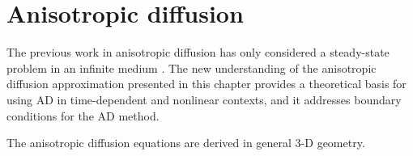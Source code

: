 
\chapter{Anisotropic diffusion}\label{chap:adDerivation}

The previous work in anisotropic diffusion has only considered a steady-state
problem in an infinite medium \cite{Lar2009c,Mor2007}. The new understanding of
the anisotropic diffusion approximation presented in this chapter provides a
theoretical basis for using AD in time-dependent and nonlinear contexts, and it
addresses boundary conditions for the AD method.

The anisotropic diffusion equations are derived in general 3-D geometry.

